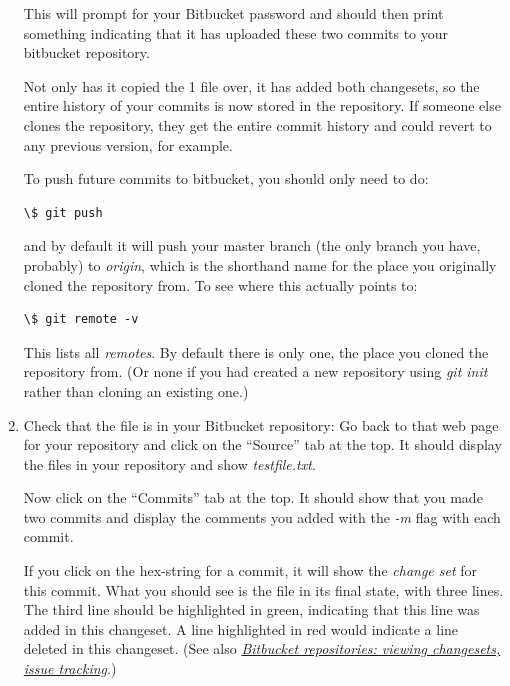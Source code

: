 \documentclass[letterpaper,10pt,english]{sphinxmanual}
\begin{document}
\begin{enumerate}
This will prompt for your Bitbucket password and should then print
something indicating that it has uploaded these two commits to
your bitbucket repository.

Not only has it copied the 1 file over, it has added both changesets, so
the entire history of your commits is now stored in the repository.  If
someone else clones the repository, they get the entire commit history
and could revert to any previous version, for example.

To push future commits to bitbucket, you should only need to do:

\begin{Verbatim}[commandchars=\\\{\}]
\$ git push
\end{Verbatim}

and by default it will push your master branch (the only branch you
have, probably) to \emph{origin}, which is the shorthand name for the
place you originally cloned the repository from.  To see where this
actually points to:

\begin{Verbatim}[commandchars=\\\{\}]
\$ git remote -v
\end{Verbatim}

This lists all \emph{remotes}.
By default there is only one, the place you cloned the repository from.
(Or none if you had created a new repository using \emph{git init} rather
than cloning an existing one.)

\item {} 
Check that the file is in your Bitbucket repository:  Go back to that web
page for your repository and click on the  ``Source'' tab at the top.  It
should display the files in your repository and show \emph{testfile.txt}.

Now click on the ``Commits'' tab at the top.  It should show that you
made two commits and display the comments you added with the \emph{-m} flag
with each commit.

If you click on the hex-string for a commit, it will show the
\emph{change set} for this commit.  What you
should see is the file in its final state, with three lines.  The third
line should be highlighted in green, indicating that this line was added
in this changeset.  A line highlighted in red would indicate a line deleted
in this changeset.  (See also {\hyperref[bitbucket:bitbucket]{\emph{Bitbucket repositories: viewing changesets, issue tracking}}}.)

\end{enumerate}
\end{document}
